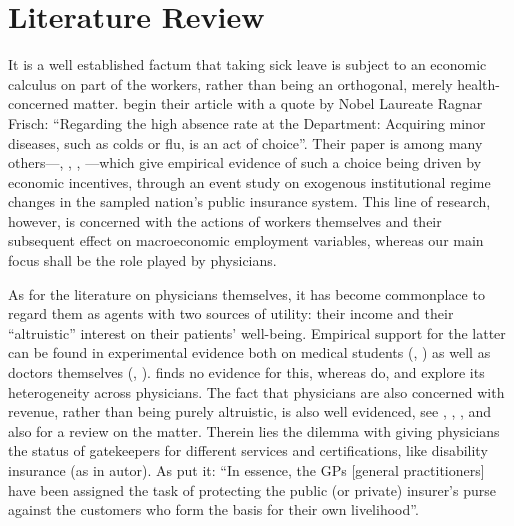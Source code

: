 \documentclass[../main.tex]{subfiles}
\begin{document}
\section{Literature Review}


It is a well established factum that taking sick leave is subject to an economic calculus on part of the workers, rather than being an orthogonal, merely health-concerned matter. \cite{JohanssonPalme} begin their article with a quote by Nobel Laureate Ragnar Frisch: ``Regarding the high absence rate at the Department: Acquiring minor diseases, such as colds or flu, is an act of choice''. Their paper is among many others—\cite{italian-jobs}, \cite{norway-jobs}, \cite{us-jobs}, \cite{sweden-jobs}—which give empirical evidence of such a choice being driven by economic incentives, through an event study on exogenous institutional regime changes in the sampled nation's public insurance system. This line of research, however, is concerned with the actions of workers themselves and their subsequent effect on macroeconomic employment variables, whereas our main focus shall be the role played by physicians.

As for the literature on physicians themselves, it has become commonplace to regard them as agents with two sources of utility: their income and their ``altruistic'' interest on their patients' well-being. Empirical support for the latter can be found in experimental evidence both on medical students (\cite{avengers}, \cite{hs-wiesen}) as well as doctors themselves (\cite{hippocrates}, \cite{brosigkoch}). \cite{crea2019physician} finds no evidence for this, whereas \cite{godager2013profit} do, and explore its heterogeneity across physicians. The fact that physicians are also concerned with revenue, rather than being purely altruistic, is also well evidenced, see \cite{clemensgottlieb}, \cite{HSW}, \cite{autor}, and also \cite{rrk2012} for a review on the matter. Therein lies the dilemma with giving physicians the status of gatekeepers for different services and certifications, like disability insurance (as in autor). As \citet[p.~1]{markussen-roed} put it: ``In essence, the GPs [general practitioners] have been assigned the task of protecting the public (or private) insurer's purse against the customers who form the basis for their own livelihood''.
\end{document}

